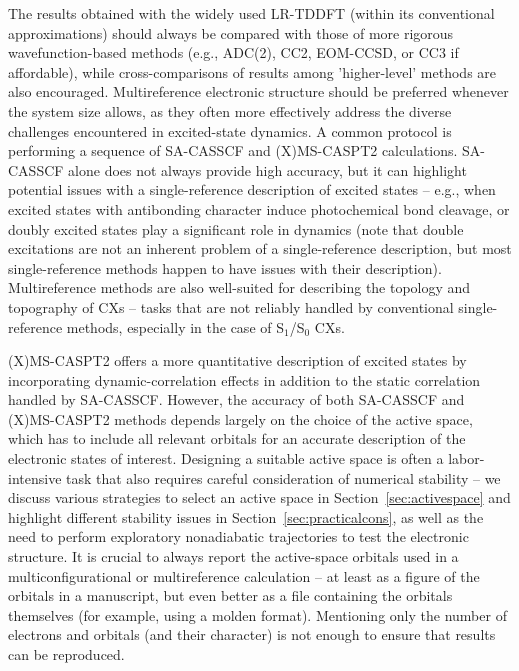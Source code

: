 \documentclass[9pt,bestpractices,pubversion]{livecoms}
\begin{document}
The results obtained with the widely used LR-TDDFT (within its conventional approximations) should always be compared with those of more rigorous wavefunction-based methods (e.g., ADC(2), CC2, EOM-CCSD, or CC3 if affordable), while cross-comparisons of results among 'higher-level' methods are also encouraged. Multireference electronic structure should be preferred whenever the system size allows, as they often more effectively address the diverse challenges encountered in excited-state dynamics. A common protocol is performing a sequence of SA-CASSCF and (X)MS-CASPT2 calculations. SA-CASSCF alone does not always provide high accuracy, but it can highlight potential issues with a single-reference description of excited states -- e.g., when excited states with antibonding character induce photochemical bond cleavage, or doubly excited states play a significant role in dynamics (note that double excitations are not an inherent problem of a single-reference description, but most single-reference methods happen to have issues with their description). Multireference methods are also well-suited for describing the topology and topography of CXs -- tasks that are not reliably handled by conventional single-reference methods, especially in the case of S$_{1}$/S$_{0}$ CXs.\cite{tuna2015assessment,taylor2023description}

(X)MS-CASPT2 offers a more quantitative description of excited states by incorporating dynamic-correlation effects in addition to the static correlation handled by SA-CASSCF. However, the accuracy of both SA-CASSCF and (X)MS-CASPT2 methods depends largely on the choice of the active space, which has to include all relevant orbitals for an accurate description of the electronic states of interest. Designing a suitable active space is often a labor-intensive task that also requires careful consideration of numerical stability -- we discuss various strategies to select an active space in Section~\ref{sec:activespace} and highlight different stability issues in Section~\ref{sec:practicalcons}, as well as the need to perform exploratory nonadiabatic trajectories to test the electronic structure. It is crucial to always report the active-space orbitals used in a multiconfigurational or multireference calculation -- at least as a figure of the orbitals in a manuscript, but even better as a file containing the orbitals themselves (for example, using a molden format). Mentioning only the number of electrons and orbitals (and their character) is not enough to ensure that results can be reproduced. 
\end{document}

